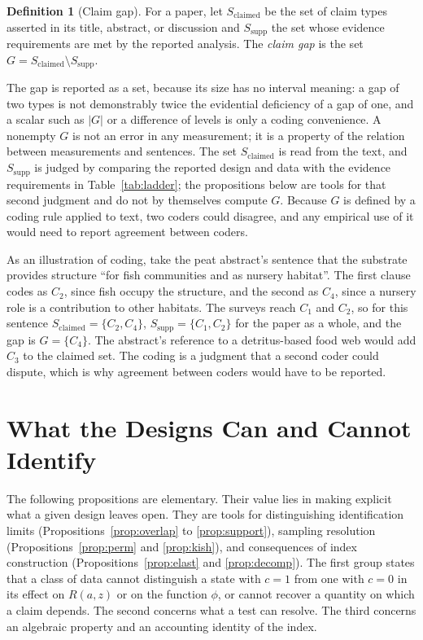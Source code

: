 \documentclass[11pt]{article}
\theoremstyle{definition}
\newtheorem{definition}{Definition}
\theoremstyle{remark}
\begin{document}
\begin{definition}[Claim gap]
For a paper, let $S_{\mathrm{claimed}}$ be the set of claim types asserted in its title, abstract, or discussion and $S_{\mathrm{supp}}$ the set whose evidence requirements are met by the reported analysis. The \emph{claim gap} is the set $G=S_{\mathrm{claimed}}\setminus S_{\mathrm{supp}}$.
\end{definition}

The gap is reported as a set, because its size has no interval meaning: a gap of two types is not demonstrably twice the evidential deficiency of a gap of one, and a scalar such as $|G|$ or a difference of levels is only a coding convenience. A nonempty $G$ is not an error in any measurement; it is a property of the relation between measurements and sentences. The set $S_{\mathrm{claimed}}$ is read from the text, and $S_{\mathrm{supp}}$ is judged by comparing the reported design and data with the evidence requirements in Table~\ref{tab:ladder}; the propositions below are tools for that second judgment and do not by themselves compute $G$. Because $G$ is defined by a coding rule applied to text, two coders could disagree, and any empirical use of it would need to report agreement between coders.

As an illustration of coding, take the peat abstract's sentence that the substrate provides structure ``for fish communities and as nursery habitat''. The first clause codes as $C_2$, since fish occupy the structure, and the second as $C_4$, since a nursery role is a contribution to other habitats. The surveys reach $C_1$ and $C_2$, so for this sentence $S_{\mathrm{claimed}}=\{C_2,C_4\}$, $S_{\mathrm{supp}}=\{C_1,C_2\}$ for the paper as a whole, and the gap is $G=\{C_4\}$. The abstract's reference to a detritus-based food web would add $C_3$ to the claimed set. The coding is a judgment that a second coder could dispute, which is why agreement between coders would have to be reported.

\section{What the Designs Can and Cannot Identify}

The following propositions are elementary. Their value lies in making explicit what a given design leaves open. They are tools for distinguishing identification limits (Propositions~\ref{prop:overlap} to \ref{prop:support}), sampling resolution (Propositions~\ref{prop:perm} and \ref{prop:kish}), and consequences of index construction (Propositions~\ref{prop:elast} and \ref{prop:decomp}). The first group states that a class of data cannot distinguish a state with $c{=}1$ from one with $c{=}0$ in its effect on $R(a,z)$ or on the function $\phi$, or cannot recover a quantity on which a claim depends. The second concerns what a test can resolve. The third concerns an algebraic property and an accounting identity of the index.
\end{document}
